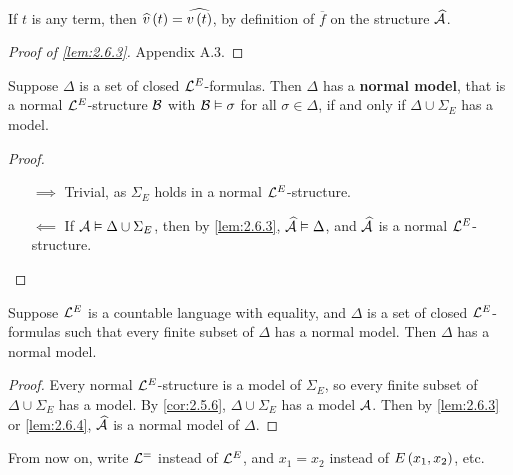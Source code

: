 \begin{note*}
If $ t $ is any term, then $ \widehat{v}\rb{t} = \widehat{v\rb{t}} $, by definition of $ \overline{f} $ on the structure $ \widehat{\AA} $.
\end{note*}

\begin{proof}[Proof of \ref{lem:2.6.3}]
Appendix A.3.
\end{proof}

\begin{lemma}
\label{lem:2.6.4}
Suppose $ \Delta $ is a set of closed $ \LL^E $-formulas. Then $ \Delta $ has a \textbf{normal model}, that is a normal $ \LL^E $-structure $ \BB $ with $ \BB \vDash \sigma $ for all $ \sigma \in \Delta $, if and only if $ \Delta \cup \Sigma_E $ has a model.
\end{lemma}

\begin{proof}
\hfill
\begin{itemize}
\item[$ \implies $] Trivial, as $ \Sigma_E $ holds in a normal $ \LL^E $-structure.
\item[$ \impliedby $] If $ \AA \vDash \Delta \cup \Sigma_E $, then by \ref{lem:2.6.3}, $ \widehat{\AA} \vDash \Delta $, and $ \widehat{\AA} $ is a normal $ \LL^E $-structure.
\end{itemize}
\end{proof}

\begin{theorem}
Suppose $ \LL^E $ is a countable language with equality, and $ \Delta $ is a set of closed $ \LL^E $-formulas such that every finite subset of $ \Delta $ has a normal model. Then $ \Delta $ has a normal model.
\end{theorem}

\begin{proof}
Every normal $ \LL^E $-structure is a model of $ \Sigma_E $, so every finite subset of $ \Delta \cup \Sigma_E $ has a model. By \ref{cor:2.5.6}, $ \Delta \cup \Sigma_E $ has a model $ \AA $. Then by \ref{lem:2.6.3} or \ref{lem:2.6.4}, $ \widehat{\AA} $ is a normal model of $ \Delta $.
\end{proof}

\begin{notation*}
From now on, write $ \LL^= $ instead of $ \LL^E $, and $ x_1 = x_2 $ instead of $ E\rb{x_1, x_2} $, etc.
\end{notation*}

\pagebreak

